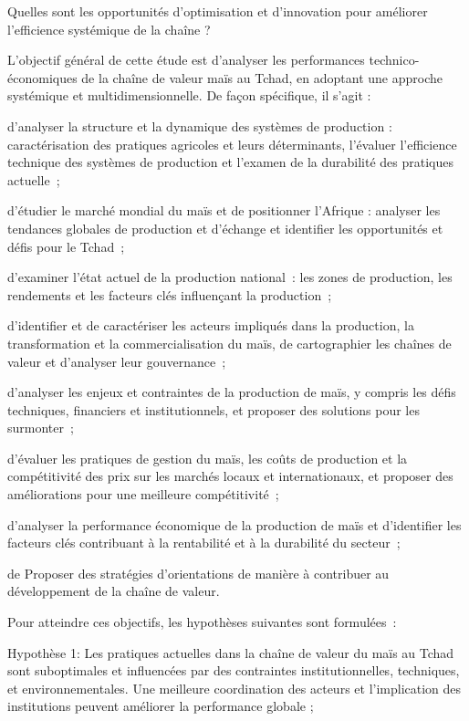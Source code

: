 \documentclass[12pt,oneside]{report}
\begin{document}
Quelles sont les opportunités d'optimisation et d'innovation pour améliorer l'efficience systémique de la chaîne ?

L’objectif général de cette étude est d’analyser les performances technico-économiques de la chaîne de valeur maïs au Tchad, en adoptant une approche systémique et multidimensionnelle. De façon spécifique, il s’agit :

d’analyser la structure et la dynamique des systèmes de production : caractérisation des pratiques agricoles et leurs déterminants, l’évaluer l'efficience technique des systèmes de production et l’examen de la durabilité des pratiques actuelle ;

d’étudier le marché mondial du maïs et de positionner l'Afrique : analyser les tendances globales de production et d'échange et identifier les opportunités et défis pour le Tchad ;

d’examiner l'état actuel de la production national : les zones de production, les rendements et les facteurs clés influençant la production ;

d’identifier et de caractériser les acteurs impliqués dans la production, la transformation et la commercialisation du maïs, de cartographier les chaînes de valeur et d’analyser leur gouvernance ;

d’analyser les enjeux et contraintes de la production de maïs, y compris les défis techniques, financiers et institutionnels, et proposer des solutions pour les surmonter ;

d’évaluer les pratiques de gestion du maïs, les coûts de production et la compétitivité des prix sur les marchés locaux et internationaux, et proposer des améliorations pour une meilleure compétitivité ;

d’analyser la performance économique de la production de maïs et d’identifier les facteurs clés contribuant à la rentabilité et à la durabilité du secteur ;

de Proposer des stratégies d’orientations de manière à contribuer au développement de la chaîne de valeur.

Pour atteindre ces objectifs, les hypothèses suivantes sont formulées :

Hypothèse 1: Les pratiques actuelles dans la chaîne de valeur du maïs au Tchad sont suboptimales et influencées par des contraintes institutionnelles, techniques, et environnementales. Une meilleure coordination des acteurs et l'implication des institutions peuvent améliorer la performance globale ;
\end{document}
